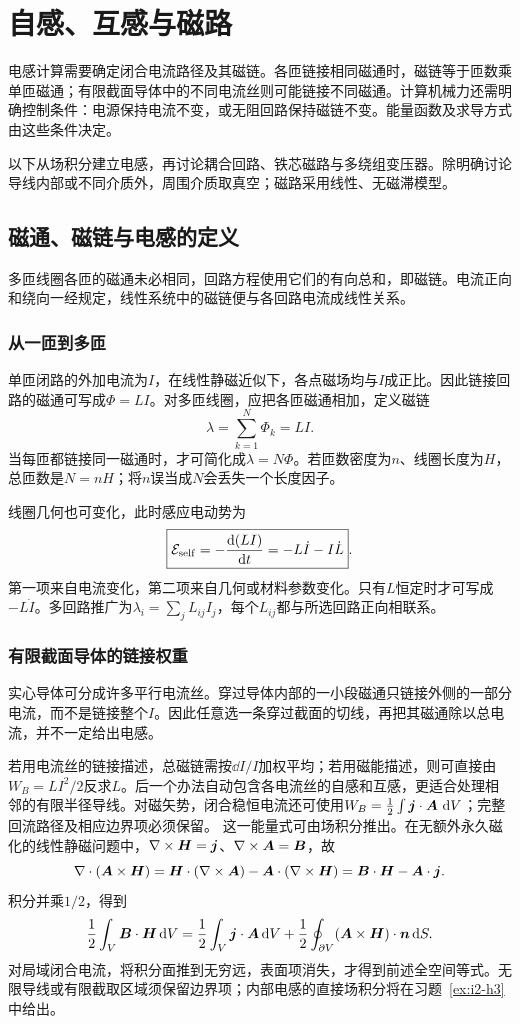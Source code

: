 \chapter{自感、互感与磁路}
电感计算需要确定闭合电流路径及其磁链。各匝链接相同磁通时，磁链等于匝数乘单匝磁通；有限截面导体中的不同电流丝则可能链接不同磁通。计算机械力还需明确控制条件：电源保持电流不变，或无阻回路保持磁链不变。能量函数及求导方式由这些条件决定。

以下从场积分建立电感，再讨论耦合回路、铁芯磁路与多绕组变压器。除明确讨论导线内部或不同介质外，周围介质取真空；磁路采用线性、无磁滞模型。



\section{磁通、磁链与电感的定义}\label{sec:i2-linkage}
多匝线圈各匝的磁通未必相同，回路方程使用它们的有向总和，即磁链。电流正向和绕向一经规定，线性系统中的磁链便与各回路电流成线性关系。

\subsection{从一匝到多匝}
单匝闭路的外加电流为$I$，在线性静磁近似下，各点磁场均与$I$成正比。因此链接回路的磁通可写成$\Phi=LI$。对多匝线圈，应把各匝磁通相加，定义磁链
\[\lambda=\sum_{k=1}^N\Phi_k=LI.
\]
当每匝都链接同一磁通时，才可简化成$\lambda=N\Phi$。若匝数密度为$n$、线圈长度为$H$，总匝数是$N=nH$；将$n$误当成$N$会丢失一个长度因子。

线圈几何也可变化，此时感应电动势为
\[\boxed{\mathcal E_{\rm self}=-\frac{\mathop{}\!\mathrm d(LI)}{\mathop{}\!\mathrm d t}
=-L\dot I-I\dot L}.
\]
第一项来自电流变化，第二项来自几何或材料参数变化。只有$L$恒定时才可写成$-L\dot I$。多回路推广为$\lambda_i=\sum_jL_{ij}I_j$，每个$L_{ij}$都与所选回路正向相联系。

\subsection{有限截面导体的链接权重}
实心导体可分成许多平行电流丝。穿过导体内部的一小段磁通只链接外侧的一部分电流，而不是链接整个$I$。因此任意选一条穿过截面的切线，再把其磁通除以总电流，并不一定给出电感。

若用电流丝的链接描述，总磁链需按$\dd I/I$加权平均；若用磁能描述，则可直接由$W_B=LI^2/2$反求$L$。后一个办法自动包含各电流丝的自感和互感，更适合处理相邻的有限半径导线。对磁矢势，闭合稳恒电流还可使用$W_B=\frac12\int\bm{j}\cdot\bm{A}\,\mathop{}\!\mathrm d V$；完整回流路径及相应边界项必须保留。
这一能量式可由场积分推出。在无额外永久磁化的线性静磁问题中，$\nabla\times\bm{H}=\bm{j}$、$\nabla\times\bm{A}=\bm{B}$，故
\[\nabla\cdot(\bm{A}\times\bm{H})
=\bm{H}\cdot(\nabla\times\bm{A})
-\bm{A}\cdot(\nabla\times\bm{H})
=\bm{B}\cdot\bm{H}-\bm{A}\cdot\bm{j}.
\]
积分并乘$1/2$，得到
\[\frac12\int_V\bm{B}\cdot\bm{H}\mathop{}\!\mathrm d V
=\frac12\int_V\bm{j}\cdot\bm{A}\mathop{}\!\mathrm d V
+\frac12\oint_{\partial V}(\bm{A}\times\bm{H})\cdot\bm{n}\mathop{}\!\mathrm d S.
\]
对局域闭合电流，将积分面推到无穷远，表面项消失，才得到前述全空间等式。无限导线或有限截取区域须保留边界项；内部电感的直接场积分将在习题~\ref{ex:i2-h3}中给出。



